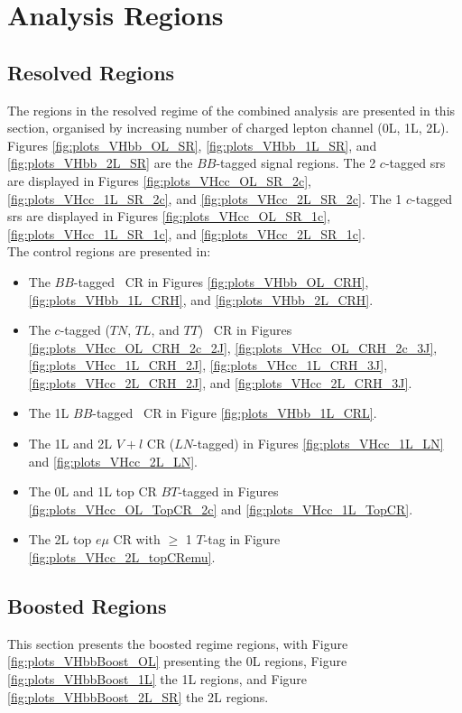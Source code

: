 \section{Analysis Regions}\label{appsec-vh-analReg}
\subsection{Resolved Regions}\label{appsec-vh-analRegRes}
The regions in the resolved regime of the combined \vhbc analysis are presented in this section, organised by increasing number of charged lepton channel (0L, 1L, 2L). Figures \ref{fig:plots_VHbb_OL_SR}, \ref{fig:plots_VHbb_1L_SR}, and \ref{fig:plots_VHbb_2L_SR} are the $BB$-tagged signal regions. The 2 $c$-tagged \glspl{sr} are displayed in Figures \ref{fig:plots_VHcc_OL_SR_2c}, \ref{fig:plots_VHcc_1L_SR_2c}, and \ref{fig:plots_VHcc_2L_SR_2c}. The 1 $c$-tagged \glspl{sr} are displayed in Figures \ref{fig:plots_VHcc_OL_SR_1c}, \ref{fig:plots_VHcc_1L_SR_1c}, and \ref{fig:plots_VHcc_2L_SR_1c}. \\

The control regions are presented in:
\begin{itemize}
  \item The $BB$-tagged \highdr\ CR in Figures \ref{fig:plots_VHbb_OL_CRH}, \ref{fig:plots_VHbb_1L_CRH}, and \ref{fig:plots_VHbb_2L_CRH}.
  \item The $c$-tagged ($TN$, $TL$, and $TT$) \highdr\ CR in Figures \ref{fig:plots_VHcc_OL_CRH_2c_2J}, \ref{fig:plots_VHcc_OL_CRH_2c_3J}, \ref{fig:plots_VHcc_1L_CRH_2J}, \ref{fig:plots_VHcc_1L_CRH_3J}, \ref{fig:plots_VHcc_2L_CRH_2J}, and \ref{fig:plots_VHcc_2L_CRH_3J}.
  \item The 1L $BB$-tagged \lowdr\ CR in Figure \ref{fig:plots_VHbb_1L_CRL}.
  \item The 1L and 2L $V+l$ CR ($LN$-tagged) in Figures \ref{fig:plots_VHcc_1L_LN} and \ref{fig:plots_VHcc_2L_LN}.
  \item The 0L and 1L top CR $BT$-tagged in Figures \ref{fig:plots_VHcc_OL_TopCR_2c} and \ref{fig:plots_VHcc_1L_TopCR}.
  \item The 2L top $e\mu$ CR with $\geq$ 1 $T$-tag in Figure \ref{fig:plots_VHcc_2L_topCRemu}.
\end{itemize}
  
\subsection{Boosted Regions}\label{appsec-vh-analRegBoo}
This section presents the boosted regime regions, with Figure \ref{fig:plots_VHbbBoost_OL} presenting the 0L regions, Figure \ref{fig:plots_VHbbBoost_1L} the 1L regions, and Figure \ref{fig:plots_VHbbBoost_2L_SR} the 2L regions.

\clearpage

\clearpage 

\clearpage
